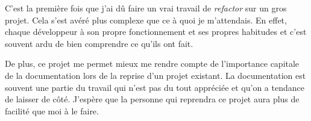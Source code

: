 C'est la première fois que j'ai dû faire un vrai travail de \emph{refactor} sur un gros projet. Cela s'est avéré plus complexe que ce à quoi je m'attendais. En effet, chaque développeur à son propre fonctionnement et ses propres habitudes et c'est souvent ardu de bien comprendre ce qu'ils ont fait.

De plus, ce projet me permet mieux me rendre compte de l'importance capitale de la documentation lors de la reprise d'un projet existant. La documentation est souvent une partie du travail qui n'est pas du tout appréciée et qu'on a tendance de laisser de côté. J'espère que la personne qui reprendra ce projet aura plus de facilité que moi à le faire.

\vfil
\hspace{8cm}\makeatletter\@author\makeatother\par
\hspace{8cm}\begin{minipage}{5cm}
    \printsignature
\end{minipage}